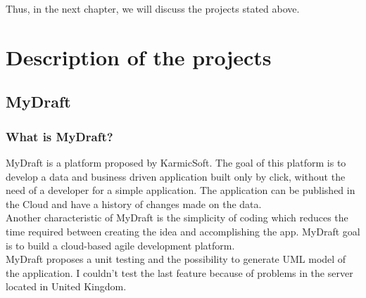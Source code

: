 \documentclass{report}
\begin{document}
Thus, in the next chapter, we will discuss the projects stated above.

\chapter{Description of the projects}
\section{MyDraft}
\subsection{What is MyDraft?}
MyDraft is a platform proposed by KarmicSoft. The goal of this platform is to develop a data and business driven application built only by click, without the need of a developer for a simple application. The application can be published in the Cloud and have a history of changes made on the data.\\

Another characteristic of MyDraft is the simplicity of coding which reduces the time required between creating the idea and accomplishing the app. MyDraft goal is to build a cloud-based agile development platform.\\

MyDraft proposes a unit testing and the possibility to generate UML model of the application. I couldn't test the last feature because of problems in the server located in United Kingdom.\\
\end{document}
